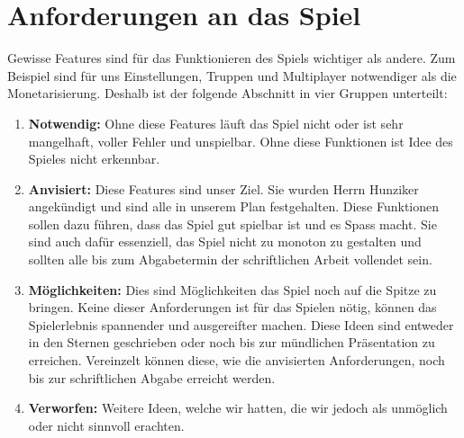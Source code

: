 \section{Anforderungen an das Spiel}
\label{chap:foo}
Gewisse Features sind für das Funktionieren des Spiels wichtiger als andere.
Zum Beispiel sind für uns Einstellungen, Truppen und Multiplayer notwendiger als die Monetarisierung.
Deshalb ist der folgende Abschnitt in vier Gruppen unterteilt:
\begin{enumerate}
    \item \textbf{Notwendig:}
        Ohne diese Features läuft das Spiel nicht oder ist sehr mangelhaft,
        voller Fehler und unspielbar. Ohne diese Funktionen ist Idee des Spieles nicht erkennbar.
    \item \textbf{Anvisiert:}
        Diese Features sind unser Ziel. Sie wurden Herrn Hunziker angekündigt und sind alle in unserem Plan festgehalten.
        Diese Funktionen sollen dazu führen, dass das Spiel
        gut spielbar ist und es Spass macht. Sie sind auch dafür essenziell, das Spiel nicht zu monoton zu gestalten und sollten
        alle bis zum Abgabetermin der schriftlichen Arbeit vollendet sein.
    \item \textbf{Möglichkeiten:}
        Dies sind Möglichkeiten das Spiel noch auf die Spitze zu bringen. Keine dieser Anforderungen ist für das Spielen nötig,
        können das Spielerlebnis spannender und ausgereifter machen. Diese
        Ideen sind entweder in den Sternen geschrieben oder noch bis zur mündlichen Präsentation zu erreichen.
        Vereinzelt können diese, wie die anvisierten Anforderungen, noch bis zur schriftlichen Abgabe erreicht werden.
    \item \textbf{Verworfen:}
        Weitere Ideen, welche wir hatten, die wir jedoch als unmöglich oder nicht sinnvoll erachten.
\end{enumerate}

